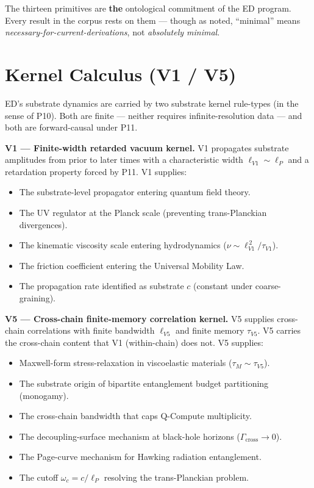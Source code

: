 \documentclass[11pt,a4paper]{article}
\begin{document}
The thirteen primitives are \textbf{the} ontological commitment of the ED program. Every result in the corpus rests on them --- though as noted, ``minimal'' means \emph{necessary-for-current-derivations}, not \emph{absolutely minimal}.

\section{Kernel Calculus (V1 / V5)}

ED's substrate dynamics are carried by two substrate kernel rule-types (in the sense of P10). Both are finite --- neither requires infinite-resolution data --- and both are forward-causal under P11.

\textbf{V1 --- Finite-width retarded vacuum kernel.} V1 propagates substrate amplitudes from prior to later times with a characteristic width $\ell_{V1} \sim \ell_P$ and a retardation property forced by P11. V1 supplies:

\begin{itemize}[noitemsep]
\item The substrate-level propagator entering quantum field theory.
\item The UV regulator at the Planck scale (preventing trans-Planckian divergences).
\item The kinematic viscosity scale entering hydrodynamics ($\nu \sim \ell_{V1}^{\,2} / \tau_{V1}$).
\item The friction coefficient entering the Universal Mobility Law.
\item The propagation rate identified as substrate $c$ (constant under coarse-graining).
\end{itemize}

\textbf{V5 --- Cross-chain finite-memory correlation kernel.} V5 supplies cross-chain correlations with finite bandwidth $\ell_{V5}$ and finite memory $\tau_{V5}$. V5 carries the cross-chain content that V1 (within-chain) does not. V5 supplies:

\begin{itemize}[noitemsep]
\item Maxwell-form stress-relaxation in viscoelastic materials ($\tau_M \sim \tau_{V5}$).
\item The substrate origin of bipartite entanglement budget partitioning (monogamy).
\item The cross-chain bandwidth that caps Q-Compute multiplicity.
\item The decoupling-surface mechanism at black-hole horizons ($\Gamma_\mathrm{cross} \to 0$).
\item The Page-curve mechanism for Hawking radiation entanglement.
\item The cutoff $\omega_c = c/\ell_P$ resolving the trans-Planckian problem.
\end{itemize}
\end{document}
